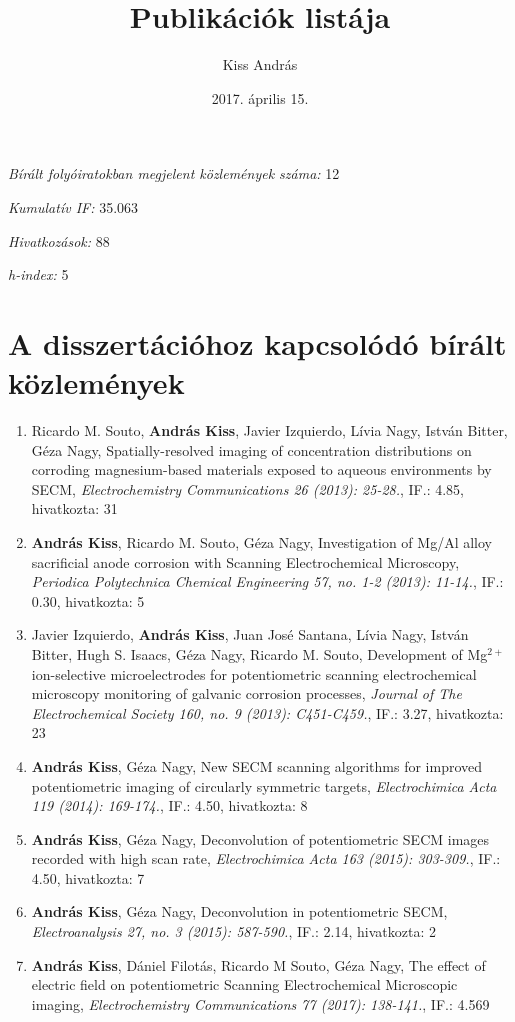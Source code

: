 \documentclass[11pt,a4paper,roman]{article}
\date{2017. április 15.}
\title{Publikációk listája}
\author{Kiss András}
\begin{document}
\maketitle

\begin{center}
\emph{Bírált folyóiratokban megjelent közlemények száma:} 12

\emph{Kumulatív IF:} 35.063

\emph{Hivatkozások:} 88

\emph{h-index:} 5
\end{center}

\section{A disszertációhoz kapcsolódó bírált közlemények}
\begin{enumerate}

\item Ricardo M. Souto, \textbf{András Kiss}, Javier Izquierdo, Lívia Nagy, István Bitter, Géza Nagy, Spatially-resolved imaging of concentration distributions on corroding mag\-ne\-si\-um-based materials exposed to aqueous environments by SECM, \emph{Electrochemistry Communications 26 (2013): 25-28.}, IF.: 4.85, hivatkozta: 31

\item \textbf{András Kiss}, Ricardo M. Souto, Géza Nagy, Investigation of Mg/Al alloy sacrificial anode corrosion with Scanning Electrochemical Microscopy, \emph{Periodica Polytechnica Chemical Engineering 57, no. 1-2 (2013): 11-14.}, IF.: 0.30, hivatkozta: 5

\item Javier Izquierdo, \textbf{András Kiss}, Juan José Santana, Lívia Nagy, István Bitter, Hugh S. Isaacs, Géza Nagy, Ricardo M. Souto, Development of Mg$^{2+}$ ion-selective microelectrodes for potentiometric scanning electrochemical microscopy monitoring of galvanic corrosion processes, \emph{Journal of The Electrochemical Society 160, no. 9 (2013): C451-C459.}, IF.: 3.27, hivatkozta: 23

\item \textbf{András Kiss}, Géza Nagy, New SECM scanning algorithms for improved potentiometric imaging of circularly symmetric targets, \emph{Electrochimica Acta 119 (2014): 169-174.}, IF.: 4.50, hivatkozta: 8

\item \textbf{András Kiss}, Géza Nagy, Deconvolution of potentiometric SECM images recorded with high scan rate, \emph{Electrochimica Acta 163 (2015): 303-309.}, IF.: 4.50, hivatkozta: 7

\item \textbf{András Kiss}, Géza Nagy, Deconvolution in potentiometric SECM, \emph{Electroanalysis 27, no. 3 (2015): 587-590.}, IF.: 2.14, hivatkozta: 2


\item \textbf{András Kiss}, Dániel Filotás, Ricardo M Souto, Géza Nagy, The effect of electric field on potentiometric Scanning Electrochemical Microscopic imaging, \emph{Electrochemistry Communications 77 (2017): 138-141.}, IF.: 4.569
\end{enumerate}
\end{document}
